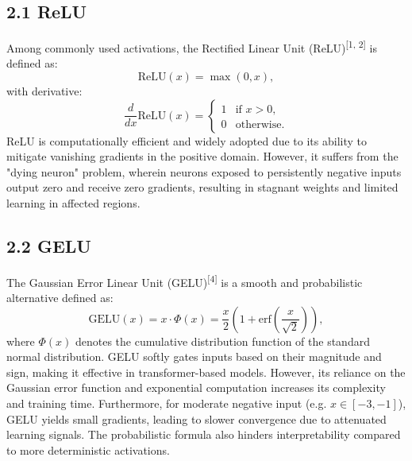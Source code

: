 \documentclass{article}
\begin{document}








\vspace{7pt}







\subsection*{2.1 ReLU}

Among commonly used activations, the Rectified Linear Unit (ReLU)\textsuperscript{[1, 2]} is defined as:
\[
\text{ReLU}(x) = \max(0, x),
\]
with derivative:
\[
\frac{d}{dx} \text{ReLU}(x) = 
\begin{cases}
1 & \text{if } x > 0, \\
0 & \text{otherwise}.
\end{cases}
\]
ReLU is computationally efficient and widely adopted due to its ability to mitigate vanishing gradients in the positive domain. However, it suffers from the "dying neuron" problem, wherein neurons exposed to persistently negative inputs output zero and receive zero gradients, resulting in stagnant weights and limited learning in affected regions.






\vspace{7pt}





\subsection*{2.2 GELU}

The Gaussian Error Linear Unit (GELU)\textsuperscript{[4]} is a smooth and probabilistic alternative defined as:
\[
\text{GELU}(x) = x \cdot \Phi(x) = \frac{x}{2} \left(1 + \text{erf}\left(\frac{x}{\sqrt{2}}\right)\right),
\]
where \( \Phi(x) \) denotes the cumulative distribution function of the standard normal distribution. GELU softly gates inputs based on their magnitude and sign, making it effective in transformer-based models. However, its reliance on the Gaussian error function and exponential computation increases its complexity and training time. Furthermore, for moderate negative input (e.g. \( x \in [-3, -1] \)), GELU yields small gradients, leading to slower convergence due to attenuated learning signals. The probabilistic formula also hinders interpretability compared to more deterministic activations.
\end{document}
